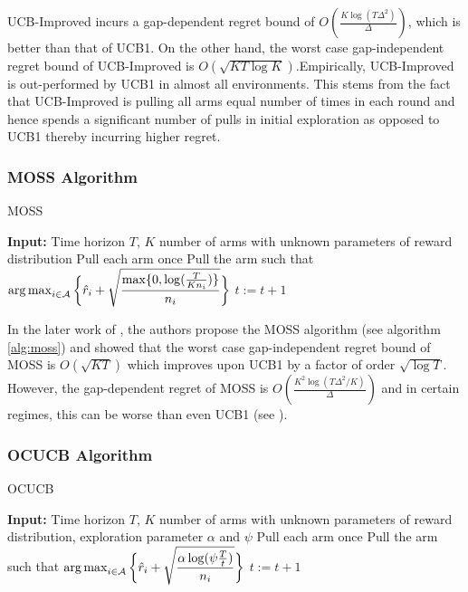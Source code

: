     UCB-Improved incurs a gap-dependent regret bound of $O\left(\frac{K\log (T\Delta^{2})}{\Delta}\right)$, which is better than that of UCB1. On the other hand, the worst case gap-independent regret bound of UCB-Improved is $O\left(\sqrt{KT\log K}\right)$.Empirically, UCB-Improved is out-performed by UCB1 in almost all environments. This stems from the fact that UCB-Improved is pulling all arms equal number of times in each round and hence spends a significant number of pulls in initial exploration as opposed to UCB1 thereby incurring higher regret.
        
    
\subsubsection{MOSS Algorithm}    

\begin{algorithm}[!th]
\caption{MOSS}
\label{alg:moss}
\begin{algorithmic}[1]
\State \textbf{Input:} Time horizon $T$, $K$ number of arms with unknown parameters of reward distribution
\State Pull each arm once
\State Pull the arm such that $\operatorname*{arg\,max}_{i\in \mathcal{A}}\bigg\lbrace\hat{r}_{i} + \sqrt{\dfrac{\max\lbrace 0,\log(\frac{T}{K n_i})\rbrace}{n_i}}\bigg\rbrace$
\State $t:=t+1 $
 \EndFor
\end{algorithmic}
\end{algorithm}
    
    In the later work of \citet{audibert2009minimax}, the authors propose the MOSS algorithm (see algorithm \ref{alg:moss}) and showed that the worst case gap-independent regret bound of MOSS is $O\left( \sqrt{KT} \right)$ which improves upon UCB1 by a factor of order $\sqrt{\log T}$. However, the gap-dependent regret of MOSS is $O\left( \frac{K^{2}\log\left(T\Delta^{2}/K\right)}{\Delta}\right)$ and in certain regimes, this can be worse than even UCB1 (see \citet{audibert2009minimax,lattimore2015optimally}).

\subsubsection{OCUCB Algorithm}   

\begin{algorithm}[!th]
\caption{OCUCB}
\label{alg:ocucb}
\begin{algorithmic}[1]
\State \textbf{Input:} Time horizon $T$, $K$ number of arms with unknown parameters of reward distribution, exploration parameter $\alpha$ and $\psi$
\State Pull each arm once
\State Pull the arm such that $\operatorname*{arg\,max}_{i\in \mathcal{A}}\bigg\lbrace\hat{r}_{i} + \sqrt{\dfrac{\alpha\log(\psi\frac{T}{t})}{n_i}}\bigg\rbrace$
\State $t:=t+1 $
 \EndFor
\end{algorithmic}
\end{algorithm}

